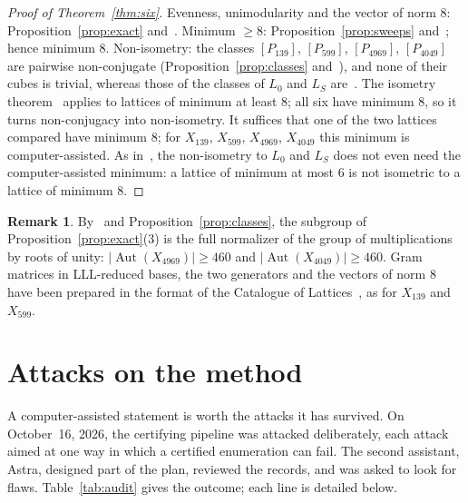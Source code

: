 \documentclass[11pt,a4paper]{amsart}
\theoremstyle{plain}
\theoremstyle{definition}
\newtheorem{remark}[proposition]{Remark}
\DeclareMathOperator{\Aut}{Aut}
\newcommand{\Lz}{L_{0}}
\newcommand{\LS}{L_{S}}
\begin{document}
\begin{proof}[Proof of Theorem~\ref{thm:six}]
Evenness, unimodularity and the vector of norm $8$: Proposition~\ref{prop:exact} and~\cite[Prop.~6.3, 6.4]{Gau26}. Minimum $\ge8$: Proposition~\ref{prop:sweeps} and~\cite[Thm.~6.11]{Gau26}; hence minimum $8$. Non-isometry: the classes $[P_{139}]$, $[P_{599}]$, $[P_{4969}]$, $[P_{4049}]$ are pairwise non-conjugate (Proposition~\ref{prop:classes} and~\cite[Rem.~6.10]{Gau26}), and none of their cubes is trivial, whereas those of the classes of $\Lz$ and $\LS$ are~\cite[Prop.~2.7]{Gau26}. The isometry theorem~\cite[Thm.~3.3]{Gau26} applies to lattices of minimum at least $8$; all six have minimum $8$, so it turns non-conjugacy into non-isometry. It suffices that one of the two lattices compared have minimum $8$; for $X_{139}$, $X_{599}$, $X_{4969}$, $X_{4049}$ this minimum is computer-assisted. As in~\cite[Prop.~6.9(a)]{Gau26}, the non-isometry to $\Lz$ and $\LS$ does not even need the computer-assisted minimum: a lattice of minimum at most $6$ is not isometric to a lattice of minimum $8$.
\end{proof}

\begin{remark}
By~\cite[Rem.~2.6]{Gau26} and Proposition~\ref{prop:classes}, the subgroup of Proposition~\ref{prop:exact}(3) is the full normalizer of the group of multiplications by roots of unity: $|\Aut(X_{4969})|\ge460$ and $|\Aut(X_{4049})|\ge460$. Gram matrices in LLL-reduced bases, the two generators and the vectors of norm $8$ have been prepared in the format of the Catalogue of Lattices~\cite{NS}, as for $X_{139}$ and $X_{599}$.
\end{remark}

\section{Attacks on the method}\label{sec:audit}

A computer-assisted statement is worth the attacks it has survived. On October~16, 2026, the certifying pipeline was attacked deliberately, each attack aimed at one way in which a certified enumeration can fail. The second assistant, Astra, designed part of the plan, reviewed the records, and was asked to look for flaws. Table~\ref{tab:audit} gives the outcome; each line is detailed below.
\end{document}

